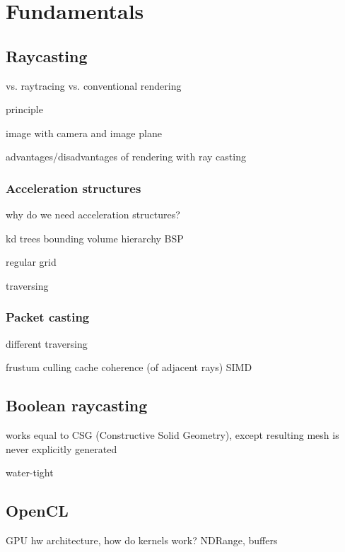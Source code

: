 \section{Fundamentals}
\label{sec:fundamentals}

\subsection{Raycasting}

vs. raytracing
vs. conventional rendering

principle

image with camera and image plane

advantages/disadvantages of rendering with ray casting

\subsubsection{Acceleration structures}

why do we need acceleration structures?

kd trees
bounding volume hierarchy
BSP

regular grid

traversing

\subsubsection{Packet casting}

different traversing

frustum culling
cache coherence (of adjacent rays)
SIMD


\subsection{Boolean raycasting}

works equal to CSG (Constructive Solid Geometry), except resulting mesh is never explicitly generated

water-tight

\subsection{OpenCL}

GPU hw architecture, how do kernels work? NDRange, buffers
